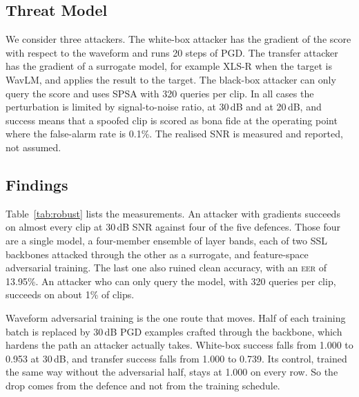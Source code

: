 \documentclass[twocolumn,a4paper,11pt]{article}
\newcommand{\eer}{\textsc{eer}}
\begin{document}
\begin{table}[t]
\centering
\caption{Attack success rate at a 0.1\% false-alarm operating point. PGD
uses 20 steps under an SNR-constrained $L_2$ budget~\cite{madry2018}, and the
realised SNR is reported. SPSA is a black-box attack with 320 queries per clip.
The table is generated from the attack logs, so it cannot drift from the
measurements. Four defence routes are closed. Waveform adversarial training is
the only one that moves white-box success off 1.000.}
\label{tab:robust}
\small

\end{table}

\subsection{Threat Model}

We consider three attackers. The white-box attacker has the gradient of the
score with respect to the waveform and runs 20 steps of PGD. The transfer
attacker has the gradient of a surrogate model, for example XLS-R when the
target is WavLM, and applies the result to the target. The black-box attacker
can only query the score and uses SPSA with 320 queries per clip. In all
cases the perturbation is limited by signal-to-noise ratio, at 30\,dB and at
20\,dB, and success means that a spoofed clip is scored as bona fide at the
operating point where the false-alarm rate is 0.1\%. The realised SNR is
measured and reported, not assumed.

\subsection{Findings}

Table~\ref{tab:robust} lists the measurements. An attacker with gradients
succeeds on almost every clip at 30\,dB SNR against four of the five defences.
Those four are a single model, a four-member ensemble of layer bands, each of
two SSL backbones attacked through the other as a surrogate, and feature-space
adversarial training. The last one also ruined clean accuracy, with an \eer{}
of 13.95\%. An attacker who can only query the model, with 320 queries per
clip, succeeds on about 1\% of clips.

Waveform adversarial training is the one route that moves. Half of each
training batch is replaced by 30\,dB PGD examples crafted through the
backbone, which hardens the path an attacker actually takes. White-box success
falls from 1.000 to 0.953 at 30\,dB, and transfer success falls from 1.000 to
0.739. Its control, trained the same way without the adversarial half, stays
at 1.000 on every row. So the drop comes from the defence and not from the
training schedule.
\end{document}
